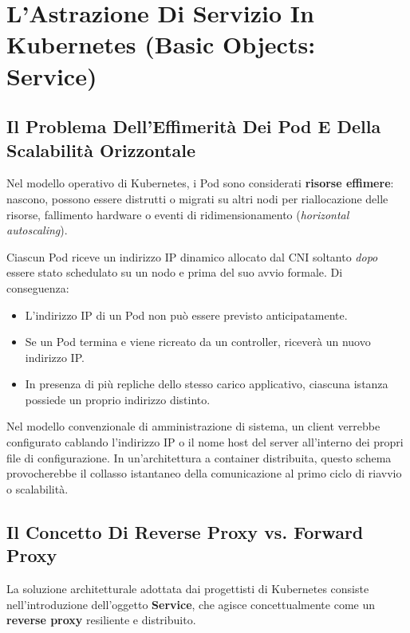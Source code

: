 \documentclass[11pt, a4paper]{article}
\begin{document}
\newpage


\section{L'Astrazione Di Servizio In Kubernetes (Basic Objects: Service)}

\subsection{Il Problema Dell'Effimerità Dei Pod E Della Scalabilità Orizzontale}
Nel modello operativo di Kubernetes, i Pod sono considerati \textbf{risorse effimere}: nascono, possono essere distrutti o migrati su altri nodi per riallocazione delle risorse, fallimento hardware o eventi di ridimensionamento (\emph{horizontal autoscaling}).

Ciascun Pod riceve un indirizzo IP dinamico allocato dal CNI soltanto \emph{dopo} essere stato schedulato su un nodo e prima del suo avvio formale. Di conseguenza:
\begin{itemize}[noitemsep]
    \item L'indirizzo IP di un Pod non può essere previsto anticipatamente.
    \item Se un Pod termina e viene ricreato da un controller, riceverà un nuovo indirizzo IP.
    \item In presenza di più repliche dello stesso carico applicativo, ciascuna istanza possiede un proprio indirizzo distinto.
\end{itemize}

Nel modello convenzionale di amministrazione di sistema, un client verrebbe configurato cablando l'indirizzo IP o il nome host del server all'interno dei propri file di configurazione. In un'architettura a container distribuita, questo schema provocherebbe il collasso istantaneo della comunicazione al primo ciclo di riavvio o scalabilità.

\subsection{Il Concetto Di Reverse Proxy vs. Forward Proxy}
La soluzione architetturale adottata dai progettisti di Kubernetes consiste nell'introduzione dell'oggetto \textbf{Service}, che agisce concettualmente come un \textbf{reverse proxy} resiliente e distribuito.
\end{document}

